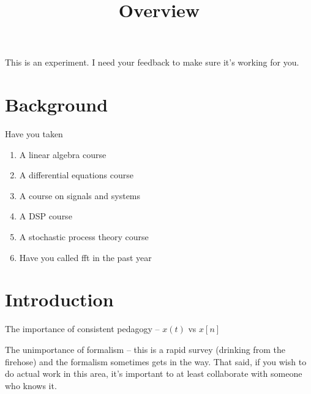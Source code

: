 

\title{Overview}

\maketitle


This is an experiment. I need your feedback to make sure it's working
for you.


\section{Background}


Have you taken

\begin{enumerate}
\item A linear algebra course
\item A differential equations course
\item A course on signals and systems
\item A DSP course
\item A stochastic process theory course
\item Have you called fft in the past year
\end{enumerate}

\section{Introduction}
The importance of consistent pedagogy -- $x(t)$ vs $x[n]$ 

The unimportance of formalism -- this is a rapid survey (drinking from the 
firehose) and the formalism sometimes gets in the way. That said, if you
wish to do actual work in this area, it's important to at least collaborate
with someone who knows it. 


